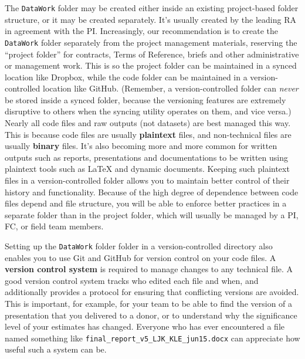 The \texttt{DataWork} folder may be created either inside
an existing project-based folder structure, or it may be created separately.
It's usually created by the leading RA in agreement with the PI.
Increasingly, our recommendation is to create the \texttt{DataWork} folder
separately from the project management materials,
reserving the ``project folder'' for contracts, Terms of Reference, briefs and other administrative or management work.
This is so the project folder can be maintained in a synced location like Dropbox,
while the code folder can be maintained in a version-controlled location like GitHub.
(Remember, a version-controlled folder can \textit{never} be stored inside a synced folder,
because the versioning features are extremely disruptive to others
when the syncing utility operates on them, and vice versa.)
Nearly all code files and raw outputs (not datasets) are best managed this way.
This is because code files are usually \textbf{plaintext} files,
and non-technical files are usually \textbf{binary} files.
It's also becoming more and more common for written outputs such as reports,
presentations and documentations to be written using plaintext
tools such as {\LaTeX} and dynamic documents.\index{{\LaTeX}}
Keeping such plaintext files in a version-controlled folder allows you
to maintain better control of their history and functionality.
Because of the high degree of dependence between code files depend and file structure,
you will be able to enforce better practices in a separate folder than in the project folder,
which will usually be managed by a PI, FC, or field team members.

Setting up the \texttt{DataWork} folder folder in a version-controlled directory
also enables you to use Git and GitHub for version control on your code files.
A \textbf{version control system} is required to manage changes to any technical file.
A good version control system tracks who edited each file and when,
and additionally provides a protocol for ensuring that conflicting versions are avoided.
This is important, for example, for your team
to be able to find the version of a presentation that you delivered to a donor,
or to understand why the significance level of your estimates has changed.
Everyone who has ever encountered a file named something like \texttt{final\_report\_v5\_LJK\_KLE\_jun15.docx}
can appreciate how useful such a system can be.


